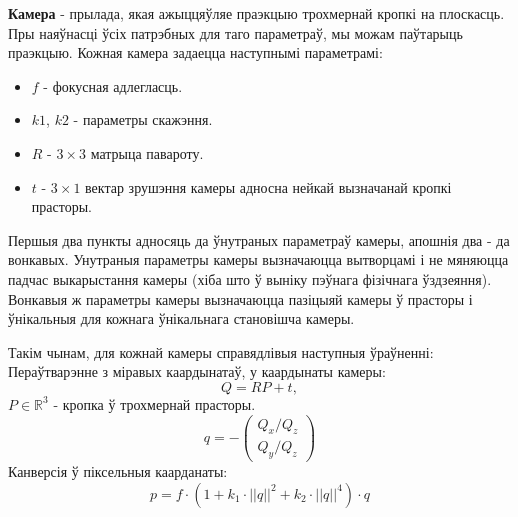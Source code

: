 {\bf Камера} - прылада, якая ажыццяўляе праэкцыю трохмернай кропкі на плоскасць. Пры наяўнасці ўсіх патрэбных для таго параметраў, мы можам паўтарыць праэкцыю. Кожная камера задаецца наступнымі параметрамі:
\begin{itemize}
    \item $f$ - фокусная адлегласць.
    \item $k1$, $k2$ - параметры скажэння.
    \item $R$ - $3 \times 3$ матрыца павароту.
    \item $t$ - $3 \times 1$ вектар зрушэння камеры адносна нейкай вызначанай кропкі прасторы.
\end{itemize} \par
Першыя два пункты адносяць да ўнутраных параметраў камеры, апошнія два - да вонкавых. Унутраныя параметры камеры вызначаюцца вытворцамі і не мяняюцца падчас выкарыстання камеры (хіба што ў выніку пэўнага фізічнага ўздзеяння). Вонкавыя ж параметры камеры вызначаюцца пазіцыяй камеры ў прасторы і ўнікальныя для кожнага ўнікальнага становішча камеры. \par
Такім чынам, для кожнай камеры справядлівыя наступныя ўраўненні:\\
Пераўтварэнне з міравых каардынатаў, у каардынаты камеры:
\begin{equation} \label{eq:world-to-camera}
    Q = RP + t,
\end{equation}
$P\in\mathbb{R}^3$ - кропка ў трохмернай прасторы.
\begin{equation} \label{eq:perspective-division}
    q = - \left( \begin{array}{ccc}
        Q_x / Q_z \\
        Q_y / Q_z \end{array} \right)
\end{equation}
Канверсія ў піксельныя каарданаты:
\begin{equation} \label{eq:to-pixel}
    p = f \cdot (1 + k_1 \cdot ||q||^2 + k_2 \cdot ||q||^4) \cdot q
\end{equation}


